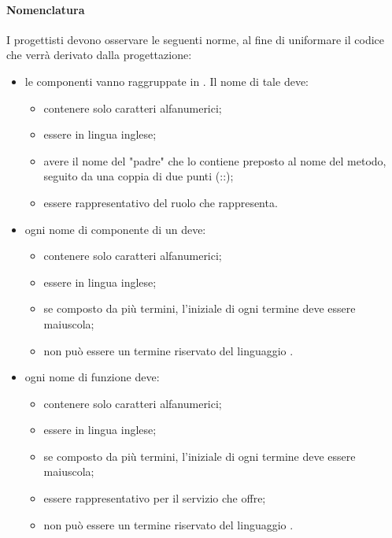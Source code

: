 \paragraph{Nomenclatura}
I progettisti devono osservare le seguenti norme, al fine di uniformare il codice che verrà derivato dalla progettazione:
\begin{itemize}
\item le componenti vanno raggruppate in . Il nome di tale  deve:
\begin{itemize}
\item contenere solo caratteri alfanumerici;
\item essere in lingua inglese;
\item avere il nome del  "padre" che lo contiene preposto al nome del metodo, seguito da una coppia di due punti (::);
\item essere rappresentativo del ruolo che rappresenta.
\end{itemize}
\item ogni nome di componente di un  deve:
\begin{itemize}
\item contenere solo caratteri alfanumerici;
\item essere in lingua inglese;
\item se composto da più termini, l'iniziale di ogni termine deve essere maiuscola;
\item non può essere un termine riservato del linguaggio .
\end{itemize}
\item ogni nome di funzione deve:
\begin{itemize}
\item contenere solo caratteri alfanumerici;
\item essere in lingua inglese;
\item se composto da più termini, l'iniziale di ogni termine deve essere maiuscola;
\item essere rappresentativo per il servizio che offre;
\item non può essere un termine riservato del linguaggio .
\end{itemize}
\end{itemize}

